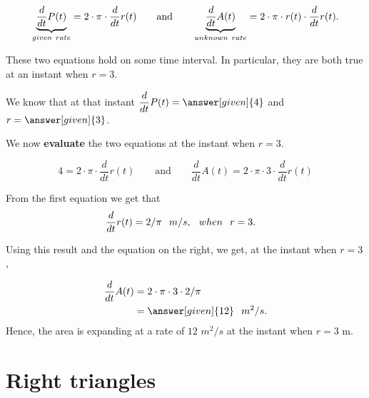 \documentclass{ximera}
\begin{document}
\begin{example}
\begin{explanation}
			\[
			\underbrace{ \dfrac{d}{dt}P(t)}_{given\hspace{0.05in} rate} = 2\cdot \pi\cdot  \dfrac{d}{dt}r(t)
			\qquad\text{and}\qquad
			\underbrace{ \dfrac{d}{dt}A(t)}_{unknown \hspace{0.05in}rate} = 2\cdot \pi\cdot r(t) \cdot  \dfrac{d}{dt}r(t).
			\]
			
			These two equations hold on some time interval. In particular, they are both true at an instant when $r=3$.
			
			We know  that at that instant $ \dfrac{d}{dt}P(t) =
			\answer[given]{4}$ and $r = \answer[given]{3}$. 
			
			We now \textbf{evaluate}  the two equations at the instant when $r=3$.
			
			\[
			4 = 2\cdot \pi\cdot \dfrac{d}{dt}r(t)
			\qquad\text{and}\qquad
			\dfrac{d}{dt}A(t) = 2\cdot \pi\cdot 3 \cdot \dfrac{d}{dt}r(t) 
			\]
			
			
			From the first equation we get that
			\begin{align*}
				\frac{\mathop{}\!d }{\mathop{}\!d t}r(t)&=  2/\pi \hspace{0.1in} m/s, \hspace{0.1in} when \hspace{0.1in} r=3.    
			\end{align*} 
			
			Using this result and the equation on the right, we get, at the instant when $r=3$,
			
			\begin{align*}
				\dfrac{d}{dt}A(t) &= 2\cdot \pi\cdot 3 \cdot 2/\pi\\
				&=\answer[given]{12}\hspace{0.1in} m^2/s.
			\end{align*}
			Hence, the area is expanding at a rate of $12$ $m^2/s$ at the instant when $r=3$ m.
		\end{explanation}
	\end{example}
	
	
	
	
	
	\section{Right triangles}
	
\end{document}
